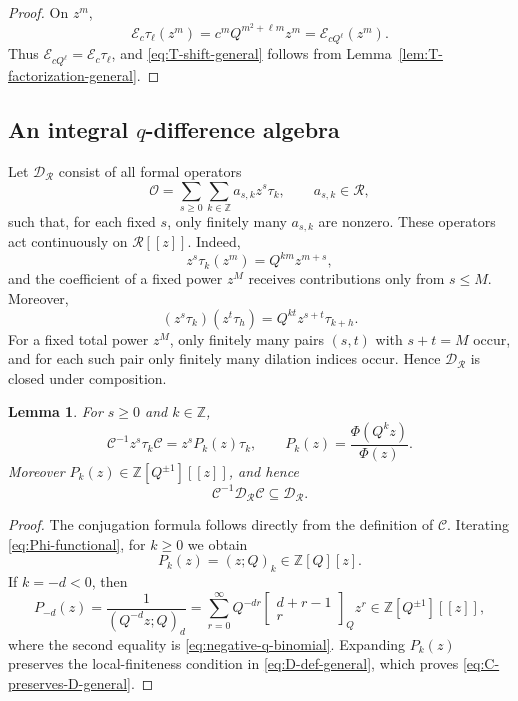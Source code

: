 \documentclass[11pt]{amsart}
\newtheorem{lemma}[theorem]{Lemma}
\newcommand{\Z}{\mathbb Z}
\newcommand{\Gauss}[2]{\begin{bmatrix}#1\\#2\end{bmatrix}_{Q}}
\begin{document}
\begin{proof}
On \(z^m\),
\[
\mathcal E_c\tau_\ell(z^m)
=
c^mQ^{m^2+\ell m}z^m
=
\mathcal E_{cQ^\ell}(z^m).
\]
Thus \(\mathcal E_{cQ^\ell}=\mathcal E_c\tau_\ell\), and
\eqref{eq:T-shift-general} follows from
Lemma~\ref{lem:T-factorization-general}.
\end{proof}

\subsection{An integral \(q\)-difference algebra}
Let \(\mathscr D_{\mathscr R}\) consist of all formal operators
\begin{equation}\label{eq:D-def-general}
\mathcal O
=
\sum_{s\geq0}\sum_{k\in\mathbb Z}
a_{s,k}z^s\tau_k,
\qquad
a_{s,k}\in\mathscr R,
\end{equation}
such that, for each fixed \(s\), only finitely many \(a_{s,k}\) are nonzero.
These operators act continuously on \(\mathscr R[[z]]\).
Indeed,
\[
z^s\tau_k(z^m)=Q^{km}z^{m+s},
\]
and the coefficient of a fixed power \(z^M\) receives contributions
only from \(s\leq M\).  Moreover,
\begin{equation}\label{eq:D-composition-general}
(z^s\tau_k)(z^t\tau_h)
=
Q^{kt}z^{s+t}\tau_{k+h}.
\end{equation}
For a fixed total power \(z^M\), only finitely many pairs \((s,t)\)
with \(s+t=M\) occur, and for each such pair only finitely many
dilation indices occur.  Hence \(\mathscr D_{\mathscr R}\) is closed
under composition.

\begin{lemma}\label{lem:C-conjugation-general}
For \(s\geq0\) and \(k\in\Z\),
\begin{equation}\label{eq:C-conjugation-general}
\mathcal C^{-1}z^s\tau_k\mathcal C
=
z^sP_k(z)\tau_k,
\qquad
P_k(z)=\frac{\Phi(Q^kz)}{\Phi(z)}.
\end{equation}
Moreover \(P_k(z)\in\Z[Q^{\pm1}][[z]]\), and hence
\begin{equation}\label{eq:C-preserves-D-general}
\mathcal C^{-1}\mathscr D_{\mathscr R}\mathcal C
\subseteq
\mathscr D_{\mathscr R}.
\end{equation}
\end{lemma}

\begin{proof}
The conjugation formula follows directly from the definition of
\(\mathcal C\).  Iterating \eqref{eq:Phi-functional}, for \(k\geq0\)
we obtain
\[
P_k(z)=(z;Q)_k\in\Z[Q][z].
\]
If \(k=-d<0\), then
\[
P_{-d}(z)=\frac1{(Q^{-d}z;Q)_d}
=
\sum_{r=0}^{\infty}
Q^{-dr}\Gauss{d+r-1}{r}z^r
\in\Z[Q^{\pm1}][[z]],
\]
where the second equality is \eqref{eq:negative-q-binomial}.  Expanding
\(P_k(z)\) preserves the local-finiteness condition in
\eqref{eq:D-def-general}, which proves
\eqref{eq:C-preserves-D-general}.
\end{proof}
\end{document}
